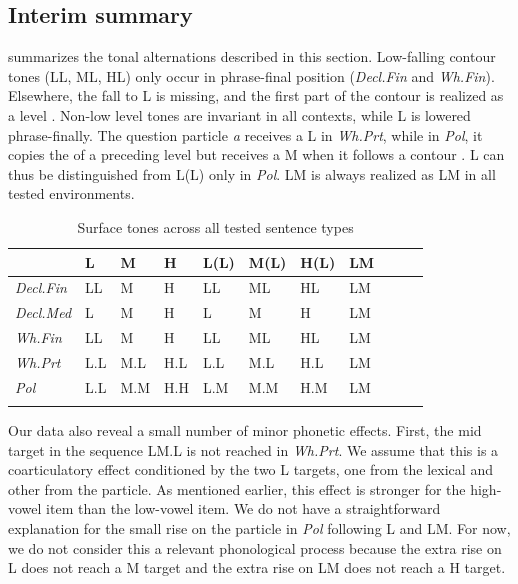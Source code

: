 \documentclass[output=paper,newtxmath,modfonts,nonflat,hidelinks]{langsci/langscibook}
\begin{document}
\subsection{Interim summary}\label{sec:Gjersoe:InterimSum}
 summarizes the tonal alternations described in this section.
Low-falling contour tones (LL, ML, HL) only occur in phrase-final position (\textit{Decl.Fin} and \textit{Wh.Fin}).
Elsewhere, the fall to L is missing, and the first part of the contour is realized as a level .
Non-low level tones are invariant in all contexts, while L is lowered phrase-finally.
The question particle \textit{a} receives a L  in \textit{Wh.Prt}, while in \textit{Pol}, it copies the  of a preceding level  but receives a M  when it follows a contour .
L can thus be distinguished from L(L) only in \textit{Pol}.
LM is always realized as LM in all tested environments.

\begin{table}[b]
\centering
\caption{Surface tones across all tested sentence types}
\label{tab:gjersoe:summarytonalchanges}
\begin{tabular}{lllllllllll}\lsptoprule
                 &L  &M  &H  &L(L)&M(L)&H(L)&LM&\\\midrule
\textit{Decl.Fin}&LL &M  &H  &LL  &ML&HL&LM& \\
\textit{Decl.Med}&L  &M  &H  &L   &M&H&LM&\\
\textit{Wh.Fin}  &LL &M  &H  &LL  &ML&HL&LM&\\
\textit{Wh.Prt}  &L.L&M.L&H.L&L.L &M.L&H.L&LM&\\
\textit{Pol}     &L.L&M.M&H.H&L.M &M.M&H.M&LM&\\
\lspbottomrule\end{tabular}
\end{table}

\clearpage
Our data also reveal a small number of minor phonetic effects.
First, the mid target in the sequence LM.L is not reached in \textit{Wh.Prt}.
We assume that this is a coarticulatory effect conditioned by the two L targets, one from the lexical  and other from the particle.
As mentioned earlier, this effect is stronger for the high-vowel item than the low-vowel item.
We do not have a straightforward explanation for the small rise on the particle in \textit{Pol} following L and LM.
For now, we do not consider this a relevant phonological process because the extra rise on L does not reach a M target and the extra rise on LM does not reach a H target. %
\end{document}
